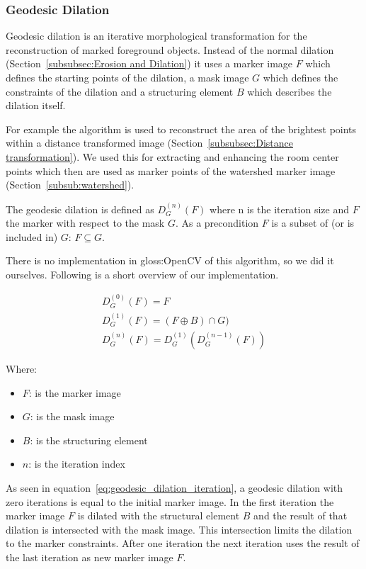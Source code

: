 \subsubsection{Geodesic Dilation}
\label{subsubsec:GeodesicDilation}

Geodesic dilation is an iterative morphological transformation for the reconstruction of marked foreground objects. Instead of the normal dilation (Section~\ref{subsubsec:Erosion and Dilation}) it uses a marker image $F$ which defines the starting points of the dilation, a mask image $G$ which defines the constraints of the dilation and a structuring element $B$ which describes the dilation itself.

For example the algorithm is used to reconstruct the area of the brightest points within a distance transformed image (Section~\ref{subsubsec:Distance transformation}). We used this for extracting and enhancing the room center points which then are used as marker points of the watershed marker image (Section~\ref{subsub:watershed}).

The geodesic dilation is defined as $D_{G}^{(n)}(F)$ where n is the iteration size and $F$ the marker with respect to the mask $G$. As a precondition $F$ is a subset of (or is included in) $G$: $F \subseteq G$.

There is no implementation in \gls{gloss:OpenCV} of this algorithm, so we did it ourselves. Following is a short overview of our implementation.
	
\begin{equation} \label{eq:geodesic_dilation_iteration}
\begin{gathered}
D_{G}^{(0)}(F) = F
\\
D_{G}^{(1)}(F) = (F \oplus B) \cap G)
\\
D_{G}^{(n)}(F) = D_{G}^{(1)}(D_{G}^{(n-1)}(F))
\end{gathered}
\end{equation}

Where:
\begin{itemize}[label=]
    \item $F$: is the marker image
    \item $G$: is the mask image
    \item $B$: is the structuring element
    \item $n$: is the iteration index
\end{itemize}

As seen in equation~\eqref{eq:geodesic_dilation_iteration}, a geodesic dilation with zero iterations is equal to the initial marker image. In the first iteration the marker image $F$ is dilated with the structural element $B$ and the result of that dilation is intersected with the mask image. This intersection limits the dilation to the marker constraints. After one iteration the next iteration uses the result of the last iteration as new marker image $F$.

